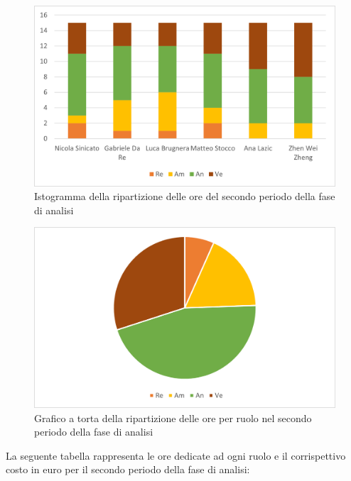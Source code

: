 \begin{figure}[H]
    \centering
    \includegraphics[scale=0.6]{img/grafi preventivo/istogrammi/analisi/periodo2.png}
    \caption{Istogramma della ripartizione delle ore del secondo periodo della fase di analisi}
\end{figure}
\begin{figure}[H]
    \centering
    \includegraphics[scale=0.6]{img/grafi preventivo/torta/analisi/periodo2.png}
    \caption{Grafico a torta della ripartizione delle ore per ruolo nel secondo periodo della fase di analisi}
\end{figure}
La seguente tabella rappresenta le ore dedicate ad ogni ruolo e il corrispettivo costo in euro per il secondo periodo della fase di analisi:

